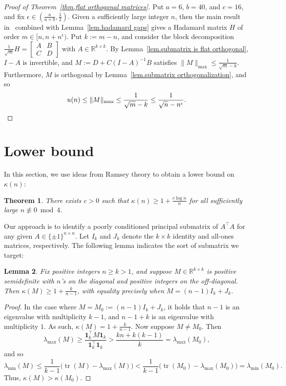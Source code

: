 \documentclass[11pt]{article}
\theoremstyle{plain}
\newtheorem{theorem}{Theorem}
\newtheorem{lemma}[theorem]{Lemma}
\theoremstyle{definition}
\begin{document}
\begin{proof}[Proof of Theorem~\ref{thm.flat orthogonal matrices}]
Put $a=6$, $b=40$, and $c=16$, and fix $\epsilon\in(\frac{a}{a+b},\frac{1}{2})$.
Given a sufficiently large integer $n$, then the main result in~\cite{DuJ:24} combined with Lemma~\ref{lem.hadamard gaps} gives a Hadamard matrix $H$ of order $m\in[n,n+n^\epsilon)$.
Put $k:=m-n$, and consider the block decomposition $\frac{1}{\sqrt{m}}H = \left[\begin{smallmatrix} A & B \\ C & D \end{smallmatrix}\right]$ with $A\in\mathbb{R}^{k\times k}$.
By Lemma~\ref{lem.submatrix is flat orthogonal}, $I-A$ is invertible, and $M:=D+C(I-A)^{-1}B$ satisfies $\|M\|_{\max}\leq\frac{1}{\sqrt{m}-k}$.
Furthermore, $M$ is orthogonal by Lemma~\ref{lem.submatrix orthogonalization}, and so
\[
u(n)
\leq \|M\|_{\max}
\leq\frac{1}{\sqrt{m}-k}
\leq\frac{1}{\sqrt{n}-n^\epsilon}.
\qedhere
\]
\end{proof}

\section{Lower bound}
\label{sec.lower bound}

In this section, we use ideas from Ramsey theory to obtain a lower bound on $\kappa(n)$:

\begin{theorem}
\label{thm.kappa lower bound}
There exists $c>0$ such that $\displaystyle\kappa(n)\geq 1+\frac{c\log n}{n}$ for all sufficiently large $n\not\equiv 0\bmod 4$.
\end{theorem}

Our approach is to identify a poorly conditioned principal submatrix of $A^\top A$ for any given $A\in\{\pm1\}^{n\times n}$.
Let $I_k$ and $J_k$ denote the $k\times k$ identity and all-ones matrices, respectively.
The following lemma indicates the sort of submatrix we target:

\begin{lemma}
\label{lem.off diag pos}
Fix positive integers $n\geq k>1$, and suppose $M\in\mathbb{R}^{k\times k}$ is positive semidefinite with $n$'s on the diagonal and positive integers on the off-diagonal.
Then $\kappa(M)\geq 1+\frac{k}{n-1}$, with equality precisely when $M=(n-1)I_k+J_k$.
\end{lemma}

\begin{proof}
In the case where $M=M_0:=(n-1)I_k+J_k$, it holds that $n-1$ is an eigenvalue with multiplicity $k-1$, and $n-1+k$ is an eigenvalue with multiplicity $1$.
As such, $\kappa(M)=1+\frac{k}{n-1}$.
Now suppose $M\neq M_0$.
Then
\[
\lambda_{\max}(M)
\geq\frac{\mathbf{1}_k^\top M\mathbf{1}_k}{\mathbf{1}_k^\top\mathbf{1}_k}
> \frac{kn+k(k-1)}{k}
=\lambda_{\max}(M_0),
\]
and so
\[
\lambda_{\min}(M)
\leq\frac{1}{k-1}\Big(\operatorname{tr}(M)-\lambda_{\max}(M)\Big)
<\frac{1}{k-1}\Big(\operatorname{tr}(M_0)-\lambda_{\max}(M_0)\Big)
=\lambda_{\min}(M_0).
\]
Thus, $\kappa(M)>\kappa(M_0)$.
\end{proof}
\end{document}
